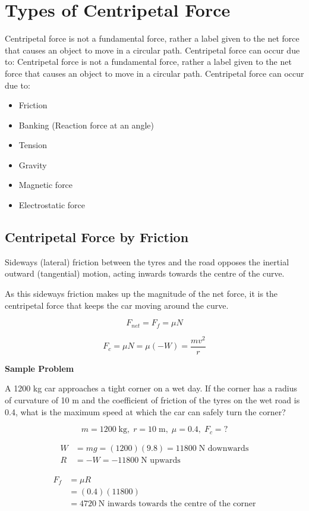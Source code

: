 \section{Types of Centripetal Force} \label{11/11/2024}
	Centripetal force is not a fundamental force, rather a label given to the net force that causes an object to move in a circular path. Centripetal force can occur due to:
	Centripetal force is not a fundamental force, rather a label given to the net force that causes an object to move in a circular path. Centripetal force can occur due to:
	\begin{itemize}
		\item Friction
		\item Banking (Reaction force at an angle)
		\item Tension
		\item Gravity
		\item Magnetic force
		\item Electrostatic force
	\end{itemize}

	\subsection{Centripetal Force by Friction}
		Sideways (lateral) friction between the tyres and the road opposes the inertial outward (tangential) motion, acting inwards towards the centre of the curve.

		As this sideways friction makes up the magnitude of the net force, it is the centripetal force that keeps the car moving around the curve.

		$$F_{net} = F_f = \mu N$$

		$$F_c = \mu N = \mu (-W) = \frac{mv^2}{r}$$

		\textbf{Sample Problem}

		A 1200 kg car approaches a tight corner on a wet day. If the corner has a radius of curvature of 10 m and the coefficient of friction of the tyres on the wet road is 0.4, what is the maximum speed at which the car can safely turn the corner?

		$$m = 1200\;\text{kg},\; r = 10\;\text{m},\;\mu = 0.4,\; F_{c} = ?$$

		\begin{align*}
			W &= mg = (1200)(9.8) = 11800\;\text{N downwards} \\
			R &= -W = -11800\;\text{N upwards}
		\end{align*}

		\begin{align*}
			F_{f} &= \mu R \\
			&= (0.4)(11800) \\
			&= 4720\;\text{N inwards towards the centre of the corner}
		\end{align*}


